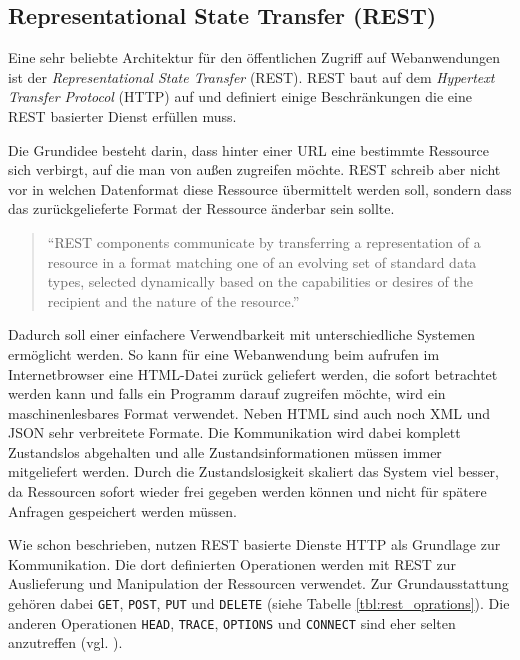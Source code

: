 \subsection{Representational State Transfer (REST)} %
\label{sub:rest}

Eine sehr beliebte Architektur für den öffentlichen Zugriff auf Webanwendungen ist der \emph{Representational State Transfer} (REST). REST baut auf dem \emph{Hypertext Transfer Protocol} (HTTP) auf und definiert einige Beschränkungen die eine REST basierter Dienst erfüllen muss. 

Die Grundidee besteht darin, dass hinter einer URL eine bestimmte Ressource sich verbirgt, auf die man von außen zugreifen möchte. REST schreib aber nicht vor in welchen Datenformat diese Ressource übermittelt werden soll, sondern dass das zurückgelieferte Format der Ressource änderbar sein sollte. 

\begin{quote}
\enquote{REST components communicate by transferring a representation of a resource
in a format matching one of an evolving set of standard data types, selected dynamically
based on the capabilities or desires of the recipient and the nature of the resource.}\cite[S.\,87]{fielding2000architectural} 
\end{quote}

Dadurch soll einer einfachere Verwendbarkeit mit unterschiedliche Systemen ermöglicht werden. So kann für eine Webanwendung beim aufrufen im Internetbrowser eine HTML-Datei zurück geliefert werden, die sofort betrachtet werden kann und falls ein Programm darauf zugreifen möchte, wird ein maschinenlesbares Format verwendet. Neben HTML sind auch noch XML und JSON sehr verbreitete Formate. Die Kommunikation wird dabei komplett Zustandslos abgehalten und alle Zustandsinformationen müssen immer mitgeliefert werden. Durch die Zustandslosigkeit skaliert das System viel besser, da Ressourcen sofort wieder frei gegeben werden können und nicht für spätere Anfragen gespeichert werden müssen.

Wie schon beschrieben, nutzen REST basierte Dienste HTTP als Grundlage zur Kommunikation. Die dort definierten Operationen werden mit REST zur Auslieferung und Manipulation der Ressourcen verwendet. Zur Grundausstattung  gehören dabei \texttt{GET}, \texttt{POST}, \texttt{PUT} und \texttt{DELETE} (siehe Tabelle \ref{tbl:rest_oprations}). Die anderen Operationen \texttt{HEAD}, \texttt{TRACE}, \texttt{OPTIONS} und \texttt{CONNECT} sind eher selten anzutreffen (vgl. \cite[S.\,76]{fielding2000architectural}). 

